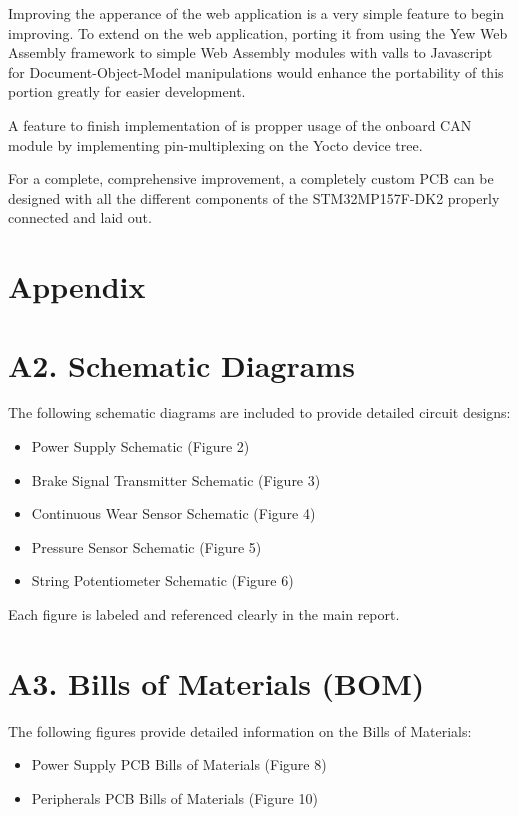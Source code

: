 \documentclass[12pt]{article}
\begin{document}
Improving the apperance of the web application is a very simple feature to begin
improving. To extend on the web application, porting it from using the Yew 
Web Assembly framework to simple Web Assembly modules with valls to Javascript 
for Document-Object-Model manipulations would enhance the portability of this portion
greatly for easier development.

A feature to finish implementation of is propper usage of the onboard CAN module 
by implementing pin-multiplexing on the Yocto device tree.

For a complete, comprehensive improvement, a completely custom PCB can be designed 
with all the different components of the STM32MP157F-DK2 properly connected
and laid out. 


\section{Appendix}
\appendix
\section*{A2. Schematic Diagrams}
The following schematic diagrams are included to provide detailed circuit designs:
\begin{itemize}
    \item Power Supply Schematic (Figure 2)
    \item Brake Signal Transmitter Schematic (Figure 3)
    \item Continuous Wear Sensor Schematic (Figure 4)
    \item Pressure Sensor Schematic (Figure 5)
    \item String Potentiometer Schematic (Figure 6)
\end{itemize}
Each figure is labeled and referenced clearly in the main report.

\section*{A3. Bills of Materials (BOM)}
The following figures provide detailed information on the Bills of Materials:
\begin{itemize}
    \item Power Supply PCB Bills of Materials (Figure 8)
    \item Peripherals PCB Bills of Materials (Figure 10)
\end{itemize}
\end{document}
